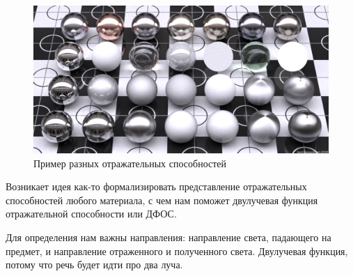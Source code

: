 \documentclass[12pt]{article}
\begin{document}
\begin{figure}[h]
  \centering
  \includegraphics[scale=0.3]{tex/brdf.png}
  \caption{Пример разных отражательных способностей}
  \label{brdf}
\end{figure}

Возникает идея как-то формализировать представление отражательных способностей любого материала,
с чем нам поможет двулучевая функция отражательной способности или ДФОС.

Для определения нам важны направления: направление света, падающего на предмет, и направление
отраженного и полученного света. Двулучевая функция, потому что речь будет идти про два луча.
\end{document}
